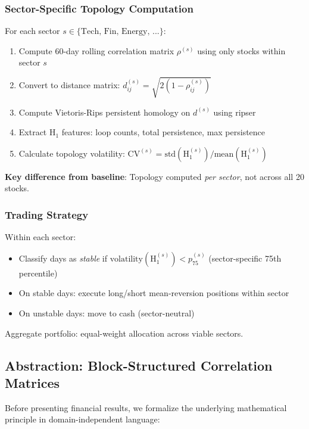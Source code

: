 \subsubsection{Sector-Specific Topology Computation}

For each sector $s \in \{\text{Tech, Fin, Energy, ...}\}$:

\begin{enumerate}
    \item Compute 60-day rolling correlation matrix $\rho^{(s)}$ using only stocks within sector $s$
    \item Convert to distance matrix: $d_{ij}^{(s)} = \sqrt{2(1 - \rho_{ij}^{(s)})}$
    \item Compute Vietoris-Rips persistent homology on $d^{(s)}$ using ripser
    \item Extract H$_1$ features: loop counts, total persistence, max persistence
    \item Calculate topology volatility: $\text{CV}^{(s)} = \text{std}(\text{H}_1^{(s)}) / \text{mean}(\text{H}_1^{(s)})$
\end{enumerate}

\textbf{Key difference from baseline}: Topology computed \textit{per sector}, not across all 20 stocks.

\subsubsection{Trading Strategy}

Within each sector:
\begin{itemize}
    \item Classify days as \textit{stable} if $\text{volatility}(\text{H}_1^{(s)}) < p_{75}^{(s)}$ (sector-specific 75th percentile)
    \item On stable days: execute long/short mean-reversion positions within sector
    \item On unstable days: move to cash (sector-neutral)
\end{itemize}

Aggregate portfolio: equal-weight allocation across viable sectors.

\subsection{Abstraction: Block-Structured Correlation Matrices}
\label{sec:block-abstraction}

Before presenting financial results, we formalize the underlying mathematical principle in domain-independent language:

